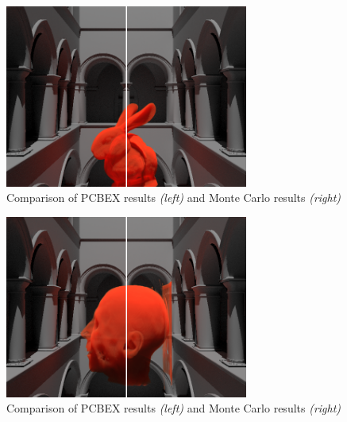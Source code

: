 \documentclass[10pt,compress,professionalfont]{beamer}
\begin{document}
\begin{frame}[c]{}

    {\centering
    \includegraphics[width=80mm]{../img/compare}\\
    }
    {\centering\scriptsize Comparison of PCBEX results \textit{(left)} and Monte Carlo results \textit{(right)}\\}

\end{frame}




\begin{frame}[c]{}

    {\centering
    \includegraphics[width=80mm]{../img/compare_head}\\
    }
    {\centering\scriptsize Comparison of PCBEX results \textit{(left)} and Monte Carlo results \textit{(right)}\\}

\end{frame}
\end{document}
